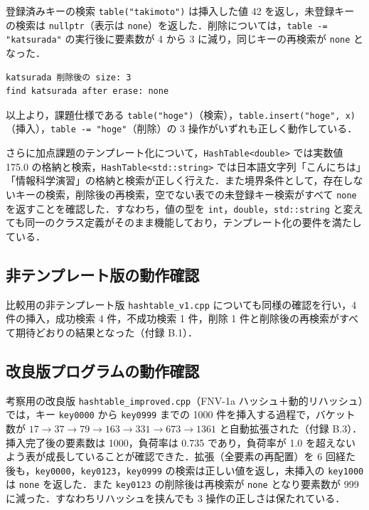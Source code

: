 登録済みキーの検索 {\tt table("takimoto")} は挿入した値 42 を返し，未登録キーの検索は {\tt nullptr}（表示は {\tt none}）を返した．削除については，{\tt table -= "katsurada"} の実行後に要素数が 4 から 3 に減り，同じキーの再検索が {\tt none} となった．

\begin{verbatim}
katsurada 削除後の size: 3
find katsurada after erase: none
\end{verbatim}

以上より，課題仕様である {\tt table("hoge")}（検索），{\tt table.insert("hoge", x)}（挿入），{\tt table -= "hoge"}（削除）の 3 操作がいずれも正しく動作している．

さらに加点課題のテンプレート化について，{\tt HashTable<double>} では実数値 175.0 の格納と検索，{\tt HashTable<std::string>} では日本語文字列「こんにちは」「情報科学演習」の格納と検索が正しく行えた．また境界条件として，存在しないキーの検索，削除後の再検索，空でない表での未登録キー検索がすべて {\tt none} を返すことを確認した．すなわち，値の型を {\tt int}，{\tt double}，{\tt std::string} と変えても同一のクラス定義がそのまま機能しており，テンプレート化の要件を満たしている．

\subsection{非テンプレート版の動作確認}

比較用の非テンプレート版 {\tt hashtable\_v1.cpp} についても同様の確認を行い，4 件の挿入，成功検索 4 件，不成功検索 1 件，削除 1 件と削除後の再検索がすべて期待どおりの結果となった（付録 B.1）．

\subsection{改良版プログラムの動作確認}

考察用の改良版 {\tt hashtable\_improved.cpp}（FNV-1a ハッシュ＋動的リハッシュ）では，キー {\tt key0000} から {\tt key0999} までの 1000 件を挿入する過程で，バケット数が
$17 \rightarrow 37 \rightarrow 79 \rightarrow 163 \rightarrow 331 \rightarrow 673 \rightarrow 1361$
と自動拡張された（付録 B.3）．挿入完了後の要素数は 1000，負荷率は 0.735 であり，負荷率が 1.0 を超えないよう表が成長していることが確認できた．拡張（全要素の再配置）を 6 回経た後も，{\tt key0000}，{\tt key0123}，{\tt key0999} の検索は正しい値を返し，未挿入の {\tt key1000} は {\tt none} を返した．また {\tt key0123} の削除後は再検索が {\tt none} となり要素数が 999 に減った．すなわちリハッシュを挟んでも 3 操作の正しさは保たれている．

